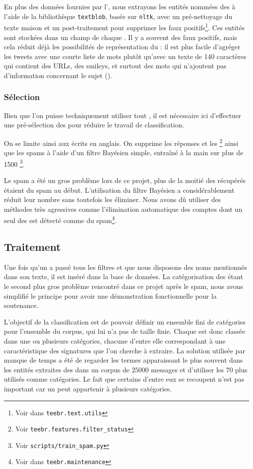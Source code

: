 En plus des données fournies par l’\api{}, nous extrayons les entités nommées
des \tweets{} à l’aide de la bibliothèque \verb|textblob|, basée sur
\verb|nltk|, avec un pré-nettoyage du texte maison et un post-traitement pour
supprimer les faux positifs\footnote{Voir dans \verb|teebr.text.utils|}. Ces
entités sont stockées dans un champ de chaque \tweet{}. Il y a souvent des
faux positifs, mais cela réduit déjà les possibilités de représentation du
\tweet{} : il est plus facile d’agréger les tweets avec une courte liste de
mots plutôt qu’avec un texte de 140 caractères qui contient des URLs, des
smileys, et surtout des mots qui n’ajoutent pas d’information concernant le
sujet ().

\subsubsection{Sélection}

Bien que l’on puisse techniquement utiliser tout \tweet{}, il est nécessaire
ici d’effectuer une pré-sélection des \tweets{} pour réduire le travail de
classification.

On se limite ainsi aux \tweets{} écrits en anglais. On supprime les réponses
et les \rts{}\footnote{Voir \verb|teebr.features.filter_status|} ainsi que les
spams à l’aide d’un filtre Bayésien simple, entraîné à la main sur plus de 1500
\tweets{}\footnote{Voir \verb|scripts/train_spam.py|}.

Le spam a été un gros problème lors de ce projet, plus de la moitié des
\tweets{} récupérés étaient du spam au début. L’utilisation du filtre Bayésien
a considérablement réduit leur nombre sans toutefois les éliminer. Nous avons
dû utiliser des méthodes très agressives comme l’élimination automatique des
comptes dont un seul des \tweets{} est détecté comme du spam\footnote{Voir dans
\verb|teebr.maintenance|}.

\subsection{Traitement}

Une fois qu’un \tweet{} a passé tous les filtres et que nous disposons des noms
mentionnés dans son texte, il est inséré dans la base de données. La
catégorisation des \tweets{} étant le second plus gros problème rencontré dans
ce projet après le spam, nous avons simplifié le principe pour avoir une
démonstration fonctionnelle pour la soutenance.

L’objectif de la classification est de pouvoir définir un ensemble fini de
catégories pour l’ensemble du corpus, qui lui n’a pas de taille finie. Chaque
\tweet{} est donc classée dans une ou plusieurs catégories, chacune d’entre
elle correspondant à une caractéristique des signatures que l’on cherche à
extraire. La solution utilisée par manque de temps a été de regarder les termes
apparaissant le plus souvent dans les entités extraites des \tweets{} dans un
corpus de $25000$ messages et d’utiliser les 70 plus utilisés comme catégories.
Le fait que certains d’entre eux se recoupent n’est pas important car un
\tweet{} peut appartenir à plusieurs catégories.

